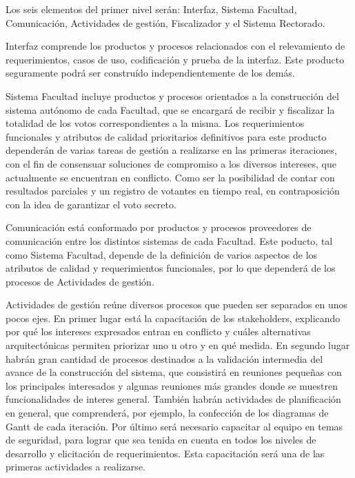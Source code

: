Los seis elementos del primer nivel serán: Interfaz, Sistema Facultad, Comunicación, Actividades de gestión, Fiscalizador y el Sistema Rectorado.
\\ \par
Interfaz comprende los productos y procesos relacionados con el relevamiento de requerimientos, casos de uso, codificación y prueba de la interfaz. Este producto seguramente podrá ser construído independientemente de los demás.
\\ \par
Sistema Facultad incluye productos y procesos orientados a la construcción del sistema autónomo de cada Facultad, que se encargará de recibir y fiscalizar la totalidad de los votos correspondientes a la misma. Los requerimientos funcionales y atributos de calidad prioritarios definitivos para este producto dependerán de varias tareas de gestión a realizarse en las primeras iteraciones, con el fin de consensuar soluciones de compromiso a los diversos intereses, que actualmente se encuentran en conflicto. Como ser la posibilidad de contar con resultados parciales y un registro de votantes en tiempo real, en contraposición con la idea de garantizar el voto secreto.
\\ \par
Comunicación está conformado por productos y procesos proveedores de comunicación entre los distintos sistemas de cada Facultad. Este poducto, tal como Sistema Facultad, depende de la definición de varios aspectos de los atributos de calidad y requerimientos funcionales, por lo que dependerá de los procesos de Actividades de gestión.
\\ \par
Actividades de gestión reúne diversos procesos que pueden ser separados en unos pocos ejes. En primer lugar está la capacitación de los stakeholders, explicando por qué los intereses expresados entran en conflicto y cuáles alternativas arquitectónicas permiten priorizar uno u otro y en qué medida.
En segundo lugar habrán gran cantidad de procesos destinados a la validación intermedia del avance de la construcción del sistema, que consistirá en reuniones pequeñas con los principales interesados y algunas reuniones más grandes donde se muestren funcionalidades de interes general.
También habrán actividades de planificación en general, que comprenderá, por ejemplo, la confección de los diagramas de Gantt de cada iteración.
Por último será necesario capacitar al equipo en temas de seguridad, para lograr que sea tenida en cuenta en todos los niveles de desarrollo y elicitación de requerimientos. Esta capacitación será una de las primeras actividades a realizarse.
